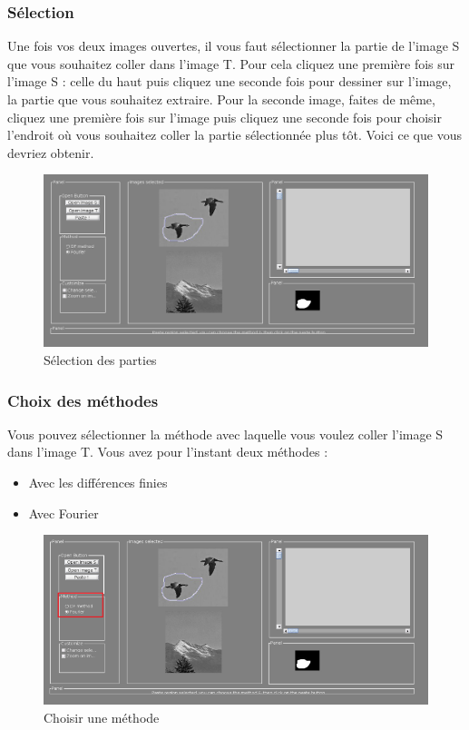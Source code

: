 \subsubsection{Sélection}
Une fois vos deux images ouvertes, il vous faut sélectionner la partie de l'image S que vous souhaitez coller dans l'image T. Pour cela cliquez une première fois sur l'image S : celle du haut puis cliquez une seconde fois pour dessiner sur l'image, la partie que vous souhaitez extraire. 
\newline
Pour la seconde image, faites de même, cliquez une première fois sur l'image puis cliquez une seconde fois pour choisir l'endroit où vous souhaitez coller la partie sélectionnée plus tôt.  Voici ce que vous devriez obtenir. 
\begin{figure}[!ht]
    \centering
    \includegraphics[scale = 0.2]{Images/selection.png}
    \caption{Sélection des parties}
\end{figure}{}
\subsubsection{Choix des méthodes}
Vous pouvez sélectionner la méthode avec laquelle vous voulez coller l'image S dans l'image T. Vous avez pour l'instant deux méthodes : 
\begin{itemize}
    \item Avec les différences finies
    \item Avec Fourier
\end{itemize}{}
\begin{figure}[!ht]
    \centering
    \includegraphics[scale = 0.3]{Images/method.png}
    \caption{Choisir une méthode}
\end{figure}{}

